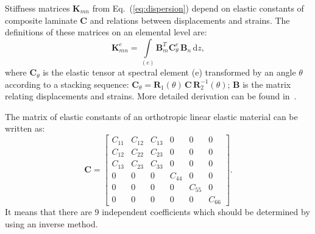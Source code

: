 \documentclass[preprint,12pt]{elsarticle}
\newcommand{\matr}[1]{\mathbf{#1}} %
\newcommand{\ud}{\mathrm{d}}
\begin{document}
Stiffness matrices $\matr{K}_{mn}$ from Eq.~(\ref{eq:dispersion}) depend on elastic constants of composite laminate $\matr{C}$ and relations between displacements and strains. 
The definitions of these matrices on an elemental level are:
\begin{equation}
	\matr{K}_{mn}^e= \int \limits_{(e)} \matr{B}_m^{T} \matr{C}_{\theta}^e \, \matr{B}_n\, \ud z, 
	\label{eq:stiffness_matrix_e}
\end{equation}
where \(\matr{C}_{\theta}\) is the elastic tensor at spectral element (e) transformed by an angle \(\theta\) according to a stacking sequence: $ \matr{C}_{\theta}= \matr{R}_1(\theta) \,\matr{C} \,\matr{R}_2^{-1}(\theta)$; \(\matr{B}\) is the matrix relating displacements and strains.
More detailed derivation can be found in~\cite{Kudela2020}. 

The matrix of elastic constants of an orthotropic linear elastic material can be written as:
\begin{equation}
	\matr{C} = \left[\begin{array}{cccccc} C_{11} & C_{12}& C_{13} & 0&0&0\\[2pt]
		C_{12}& C_{22} & C_{23}& 0&0&0\\[2pt]
		C_{13}&C_{23}&C_{33}&0&0&0\\[2pt]
		0& 0 &0&C_{44}& 0&0\\[2pt]
		0&0&0&0&C_{55}&0\\[2pt]
		0&0&0&0&0&C_{66}
	\end{array}\right]. 
	\label{eq:elastic_constatns}
\end{equation} 
It means that there are 9 independent coefficients which should be determined by using an inverse method. 
	
\end{document}
